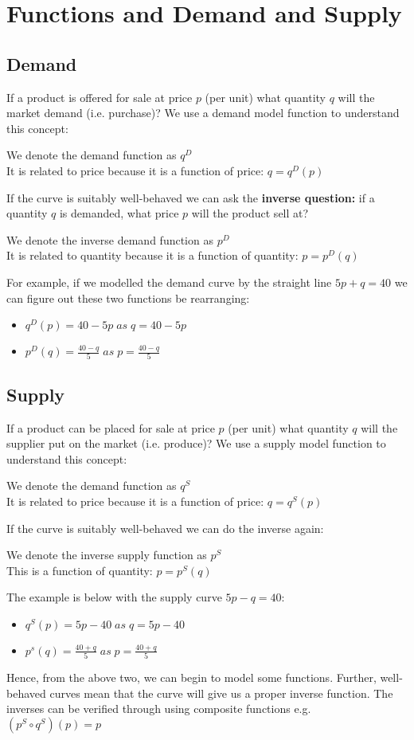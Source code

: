 \documentclass[12pt, letterpaper]{article}
\begin{document}
\section{Functions and Demand and Supply}
\subsection{Demand}
If a product is offered for sale at price $p$ (per unit) what quantity $q$ will the market demand (i.e. purchase)?
We use a demand model function to understand this concept:
\begin{center}
	We denote the demand function as $q^D$\\
	It is related to price because it is a function of price: $q = q^D(p)$
\end{center}
If the curve is suitably well-behaved we can ask the \textbf{inverse question:} if a quantity $q$ is demanded, what price $p$ will the product sell at?
\begin{center}
	We denote the inverse demand function as $p^D$\\
	It is related to quantity because it is a function of quantity: $p = p^D(q)$
\end{center}
For example, if we modelled the demand curve by the straight line $5p + q = 40$ we can figure out these two functions be rearranging:
\begin{itemize}
	\item $q^D(p) = 40-5p\; as \; q = 40 - 5p$
	\item $p^D(q) = \frac{40-q}{5}\; as \; p = \frac{40-q}{5}$
\end{itemize}
\subsection{Supply}
If a product can be placed for sale at price $p$ (per unit) what quantity $q$ will the supplier put on the market (i.e. produce)?
We use a supply model function to understand this concept:
\begin{center}
	We denote the demand function as $q^S$\\
	It is related to price because it is a function of price: $q = q^S(p)$
\end{center}
If the curve is suitably well-behaved we can do the inverse again:
\begin{center}
	We denote the inverse supply function as $p^S$\\
	This is a function of quantity: $p = p^S(q)$
\end{center}
The example is below with the supply curve $5p - q = 40$:
\begin{itemize}
	\item $q^S(p) = 5p-40 \; as \; q = 5p-40$
	\item $p^s(q) = \frac{40+q}{5} \; as \; p = \frac{40+q}{5}$
\end{itemize}
Hence, from the above two, we can begin to model some functions.
Further, well-behaved curves mean that the curve will give us a proper inverse function.
The inverses can be verified through using composite functions e.g. $(p^S \circ q^S)(p) = p$
\end{document}
